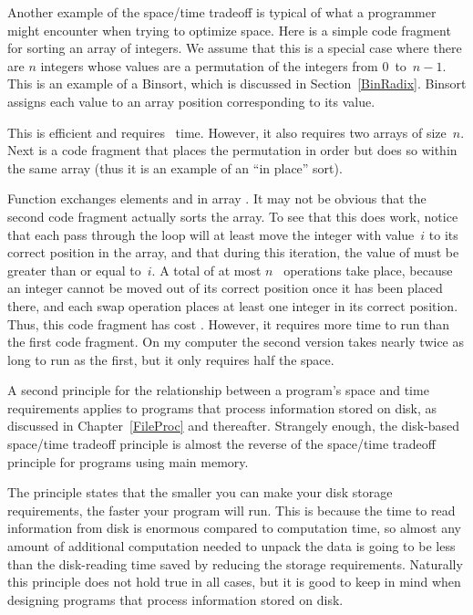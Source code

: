 Another example of the space/time tradeoff is typical of what a
programmer might encounter when trying to optimize space.
Here is a simple code fragment for sorting an array of integers.
We assume that this is a special case where there are \(n\) integers
whose values are a permutation
of the integers from 0~to~\(n-1\).
This is an example of a Binsort,
which is discussed in Section~\ref{BinRadix}.
Binsort assigns each value to an array position corresponding to its
value.


This is efficient and requires \Thetan\ time.
However, it also requires two arrays of size~\(n\).
Next is a code fragment that places the permutation in order but does
so within the same array (thus it is an example of an ``in place''
sort).


Function \noindent {} exchanges elements 
and  in array .
It may not be obvious that the second code fragment
actually sorts the array.
To see that this does work, notice that each pass through the
 loop will at least move the integer with value~\(i\)
to its correct position in the array, and that during this iteration, 
the value of  must be greater than or equal to~\(i\).
A total of at most \(n\)~ operations take place, because an
integer cannot be moved out of its correct position once it has been
placed there, and each swap operation places at least one integer in
its correct position.
Thus, this code fragment has cost \Thetan.
However, it requires more time to run than the first code fragment.
On my computer the second version takes nearly twice as long to run
as the first, but it only requires half the space.

A second principle for the relationship between a program's space and
time requirements applies to programs that process
information stored on disk, as discussed in Chapter~\ref{FileProc}
and thereafter.
Strangely enough, the disk-based space/time tradeoff principle is
almost the reverse of the space/time tradeoff principle for programs
using main memory.

The  principle states that the
smaller you can make your disk storage requirements, the faster your
program will run.
This is because the time to read information from disk is enormous
compared to computation time, so almost any amount of additional
computation needed to unpack the data is going to be less than the
disk-reading time saved by reducing the storage requirements.
Naturally this principle does not hold true in all cases,
but it is good to keep in mind when designing programs that process
information stored on disk.

